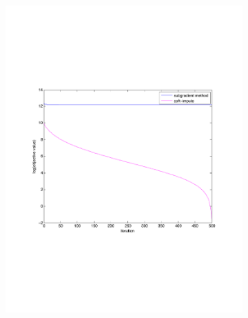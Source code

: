 \begin{figure}[h!tbp]
\begin{subfigure}[a]{0.6\textwidth}
        \includegraphics[width=\textwidth]{img/p3_04.pdf}
    \end{subfigure}
    \begin{subfigure}[a]{0.6\textwidth}

\end{subfigure}
\end{figure}
